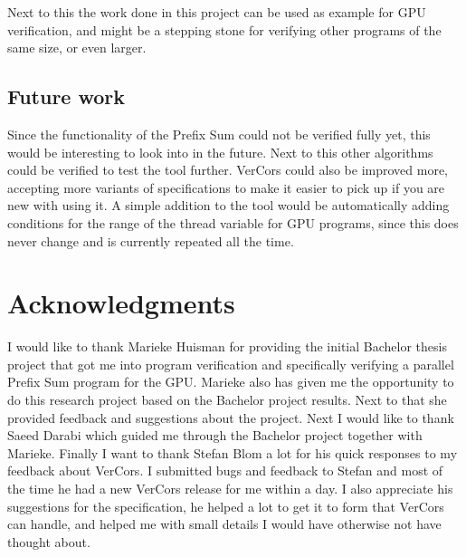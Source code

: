 \documentclass[a4paper]{article}
\begin{document}
Next to this the work done in this project can be used as example for GPU verification, and might be a stepping stone for verifying other programs of the same size, or even larger.

\subsection{Future work}
Since the functionality of the Prefix Sum could not be verified fully yet, this would be interesting to look into in the future. Next to this other algorithms could be verified to test the tool further. VerCors could also be improved more, accepting more variants of specifications to make it easier to pick up if you are new with using it. A simple addition to the tool would be automatically adding conditions for the range of the thread variable for GPU programs, since this does never change and is currently repeated all the time.


\section{Acknowledgments}
I would like to thank Marieke Huisman for providing the initial Bachelor thesis project that got me into program verification and specifically verifying a parallel Prefix Sum program for the GPU. Marieke also has given me the opportunity to do this research project based on the Bachelor project results. Next to that she provided feedback and suggestions about the project. Next I would like to thank Saeed Darabi which guided me through the Bachelor project together with Marieke. Finally I want to thank Stefan Blom a lot for his quick responses to my feedback about VerCors. I submitted bugs and feedback to Stefan and most of the time he had a new VerCors release for me within a day. I also appreciate his suggestions for the specification, he helped a lot to get it to form that VerCors can handle, and helped me with small details I would have otherwise not have thought about.




\end{document}
